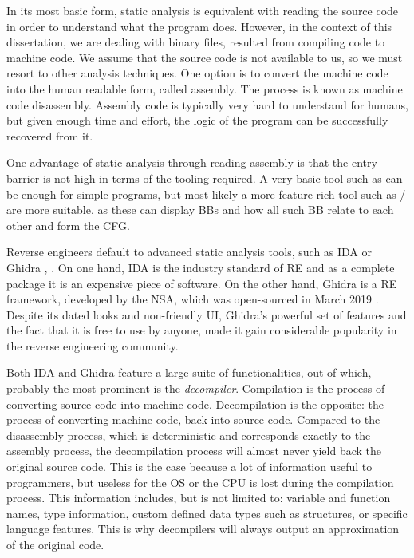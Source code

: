 In its most basic form, static analysis is equivalent with reading the source code in order to understand what the program does. However, in the context of this dissertation, we are dealing with binary files, resulted from compiling code to machine code. We assume that the source code is not available to us, so we must resort to other analysis techniques. One option is to convert the machine code into the human readable form, called assembly. The process is known as machine code disassembly. Assembly code is typically very hard to understand for humans, but given enough time and effort, the logic of the program can be successfully recovered from it. 

One advantage of static analysis through reading assembly is that the entry barrier is not high in terms of the tooling required. A very basic tool such as  \cite{objdump} can be enough for simple programs, but most likely a more feature rich tool such as / \cite{cutter} are more suitable, as these can display \glspl{BB} and how all such \gls{BB} relate to each other and form the \gls{CFG}.

Reverse engineers default to advanced static analysis tools, such as IDA or Ghidra \cite{ida}, \cite{ghidra}. On one hand, IDA is the industry standard of \gls{RE} and as a complete package it is an expensive piece of software. On the other hand, Ghidra is a \gls{RE} framework, developed by the \gls{NSA}, which was open-sourced in March 2019 \cite{Newman2019Mar}. Despite its dated looks and non-friendly \gls{UI}, Ghidra's powerful set of features and the fact that it is free to use by anyone, made it gain considerable popularity in the reverse engineering community.

\label{sec:ghidra}

Both IDA and Ghidra feature a large suite of functionalities, out of which, probably the most prominent is the \emph{decompiler}. Compilation is the process of converting source code into machine code. Decompilation is the opposite: the process of converting machine code, back into source code. Compared to the disassembly process, which is deterministic and corresponds exactly to the assembly process, the decompilation process will almost never yield back the original source code. This is the case because a lot of information useful to programmers, but useless for the \gls{OS} or the \gls{CPU} is lost during the compilation process. This information includes, but is not limited to: variable and function names, type information, custom defined data types such as structures, or specific language features. This is why decompilers will always output an approximation of the original code. 

